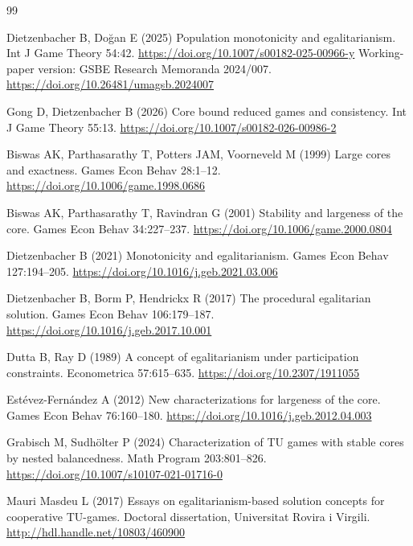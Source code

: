 \documentclass[11pt]{article}
\begin{document}
\begin{thebibliography}{99}

Dietzenbacher B, Do\u{g}an E (2025) Population monotonicity and egalitarianism.
Int J Game Theory 54:42. \url{https://doi.org/10.1007/s00182-025-00966-y}
Working-paper version: GSBE Research Memoranda 2024/007.
\url{https://doi.org/10.26481/umagsb.2024007}

Gong D, Dietzenbacher B (2026) Core bound reduced games and consistency.
Int J Game Theory 55:13. \url{https://doi.org/10.1007/s00182-026-00986-2}


Biswas AK, Parthasarathy T, Potters JAM, Voorneveld M (1999) Large cores
and exactness. Games Econ Behav 28:1--12.
\url{https://doi.org/10.1006/game.1998.0686}

Biswas AK, Parthasarathy T, Ravindran G (2001) Stability and largeness of
the core. Games Econ Behav 34:227--237.
\url{https://doi.org/10.1006/game.2000.0804}

Dietzenbacher B (2021) Monotonicity and egalitarianism.
Games Econ Behav 127:194--205.
\url{https://doi.org/10.1016/j.geb.2021.03.006}

Dietzenbacher B, Borm P, Hendrickx R (2017) The procedural egalitarian
solution. Games Econ Behav 106:179--187.
\url{https://doi.org/10.1016/j.geb.2017.10.001}

Dutta B, Ray D (1989) A concept of egalitarianism under participation
constraints. Econometrica 57:615--635.
\url{https://doi.org/10.2307/1911055}

Est\'evez-Fern\'andez A (2012) New characterizations for largeness of the
core. Games Econ Behav 76:160--180.
\url{https://doi.org/10.1016/j.geb.2012.04.003}

Grabisch M, Sudh\"olter P (2024) Characterization of TU games with stable
cores by nested balancedness. Math Program 203:801--826.
\url{https://doi.org/10.1007/s10107-021-01716-0}

Mauri Masdeu L (2017) Essays on egalitarianism-based solution concepts for
cooperative TU-games. Doctoral dissertation, Universitat Rovira i Virgili.
\url{http://hdl.handle.net/10803/460900}


\end{thebibliography}
\end{document}
